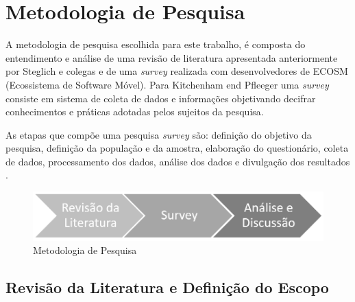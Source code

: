 \chapter{\label{chap:intro}Metodologia de Pesquisa}


A metodologia de pesquisa escolhida para este trabalho, é composta do entendimento e análise de uma revisão de literatura apresentada anteriormente por Steglich e colegas \cite{caio2019} e de uma \textit{survey} realizada com desenvolvedores de ECOSM (Ecossistema de Software Móvel). Para Kitchenham end Pfleeger \cite{pfleeger2001principles} uma \textit{survey} consiste em sistema de coleta de dados e informações objetivando decifrar conhecimentos e práticas adotadas pelos sujeitos da pesquisa.
   
As etapas que compõe uma pesquisa \textit{survey} são:  definição do objetivo da pesquisa, definição da população e da amostra, elaboração do questionário, coleta de dados, processamento dos dados, análise dos dados e divulgação dos resultados \cite{vieira2010dicionario}.

\begin{figure}
    \centering
    \includegraphics[scale=0.66]{fig/metodologia.PNG}
    \caption{Metodologia de Pesquisa}
    \label{fig:my_label}
\end{figure}


\section{\textbf{Revisão da Literatura e Definição do Escopo}}


